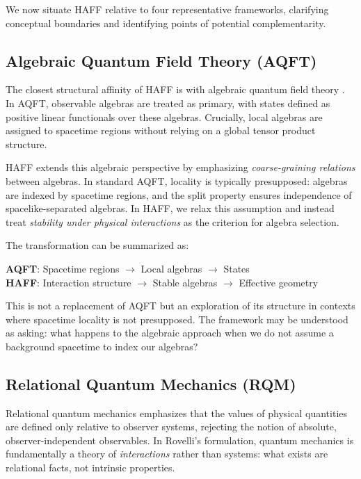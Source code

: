 \documentclass[12pt,a4paper,openany]{book}
\begin{document}
We now situate HAFF relative to four representative frameworks, clarifying conceptual boundaries and identifying points of potential complementarity.

\subsection{Algebraic Quantum Field Theory (AQFT)}

The closest structural affinity of HAFF is with algebraic quantum field theory \cite{Haag1996,Araki1999}. In AQFT, observable algebras are treated as primary, with states defined as positive linear functionals over these algebras. Crucially, local algebras are assigned to spacetime regions without relying on a global tensor product structure.

HAFF extends this algebraic perspective by emphasizing \emph{coarse-graining relations} between algebras. In standard AQFT, locality is typically presupposed: algebras are indexed by spacetime regions, and the split property ensures independence of spacelike-separated algebras. In HAFF, we relax this assumption and instead treat \emph{stability under physical interactions} as the criterion for algebra selection.

The transformation can be summarized as:
\begin{center}
\textbf{AQFT}: Spacetime regions $\to$ Local algebras $\to$ States \\
\textbf{HAFF}: Interaction structure $\to$ Stable algebras $\to$ Effective geometry
\end{center}

This is not a replacement of AQFT but an exploration of its structure in contexts where spacetime locality is not presupposed. The framework may be understood as asking: what happens to the algebraic approach when we do not assume a background spacetime to index our algebras?

\subsection{Relational Quantum Mechanics (RQM)}

Relational quantum mechanics \cite{Rovelli1996,LaudisaRovelli2021} emphasizes that the values of physical quantities are defined only relative to observer systems, rejecting the notion of absolute, observer-independent observables. In Rovelli's formulation, quantum mechanics is fundamentally a theory of \emph{interactions} rather than systems: what exists are relational facts, not intrinsic properties.
\end{document}
